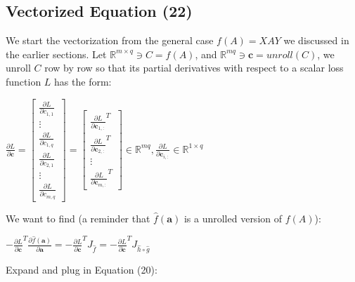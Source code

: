 \documentclass{article}
\begin{document}


\subsection{Vectorized Equation (22)}
We start the vectorization from the general case $f(A)=XAY$ we discussed in the earlier sections. Let $ \mathbb{R}^{m\times q}\ni C = f(A)$, and $\mathbb{R}^{mq}\ni\mathbf{c} = unroll(C)$, we unroll $C$ row by row so that its partial derivatives with respect to a scalar loss function $L$ has the form:
\begin{center}
    $\frac{\partial L}{\partial \mathbf{c}} = 
    \begin{bmatrix}
        \frac{\partial L}{\partial c_{1,1}} \\ \vdots \\\frac{\partial L}{\partial c_{1,q}}\\ \frac{\partial L}{\partial c_{2,1}} \\ \vdots \\ \frac{\partial L}{\partial c_{m,q}}
    \end{bmatrix} =
    \begin{bmatrix}
        \frac{\partial L}{\partial \mathbf{c}_{1,:}}^T \\ \frac{\partial L}{\partial \mathbf{c}_{2,:}}^T\\ \vdots \\ \frac{\partial L}{\partial \mathbf{c}_{m,:}}^T
    \end{bmatrix} \in \mathbb{R}^{mq}, \frac{\partial L}{\partial \mathbf{c}_{i,:}} \in \mathbb{R}^{1\times q}
    $ 
\end{center}
We want to find (a reminder that $\widehat{f}(\mathbf{a})$ is a unrolled version of $f(A)$):
\begin{center}
$
-\frac{\partial L}{\partial \mathbf{c}}^{T} \frac{\partial \widehat{f}(\mathbf{a})}{\partial \mathbf{a}}=
-\frac{\partial L}{\partial \mathbf{c}}^{T}  J_{\widehat{f}} = -\frac{\partial L}{\partial \mathbf{c}}^{T} J_{\widehat{h}\circ\widehat{g}}$
\end{center}
Expand and plug in Equation (20):
\end{document}

